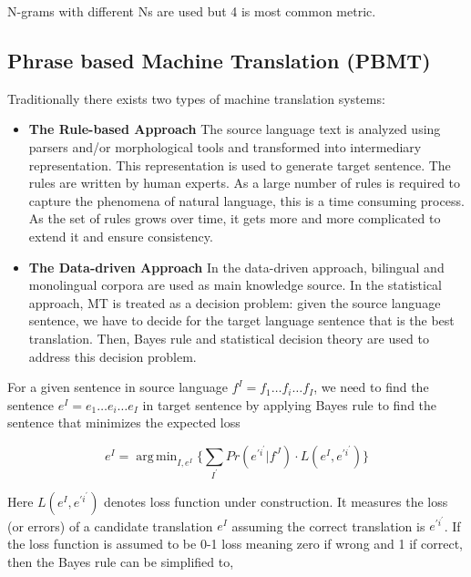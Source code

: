 \documentclass[a4paper]{article}
\DeclareMathOperator*{\argmin}{arg\,min}
\begin{document}
N-grams with different Ns are used but 4 is most common metric.


\subsection{Phrase based Machine Translation (PBMT)}
Traditionally there exists two types of machine translation systems:

\begin{itemize}

  \item \textbf{The Rule-based Approach}
        The  source language text is analyzed using parsers and/or morphological
        tools   and   transformed  into    intermediary   representation.   This
        representation  is  used  to  generate  target  sentence.  The rules are
        written  by human  experts. As  a large number of  rules is  required to
        capture  the  phenomena  of natural language,  this is a  time consuming
        process.  As the set of rules grows over time, it gets more and more
        complicated to extend it and ensure consistency.

  \item \textbf{The Data-driven Approach}
        In the data-driven  approach, bilingual and monolingual corpora are used
        as main knowledge source.  In the statistical approach, MT is treated as
        a  decision problem:  given the  source  language  sentence,  we have to
        decide  for the  target language  sentence that is the best translation.
        Then,  Bayes rule  and  statistical  decision theory are used to address
        this decision problem.
\end{itemize}


For a given sentence in source language $f^{I} = f_1\ldots f_i\ldots f_{I} $, we
need to find the sentence $e^{I} = e_1\ldots e_i\ldots e_{I}$ in target sentence
by applying Bayes rule to find the sentence that minimizes the expected loss


\begin{equation*}
e^{I} =  \argmin_{I,e^{I}} \Bigg\{
  \sum_{I^{'} } Pr(e^{\prime i^\prime} | f^J) \cdot L(e^I, e^{\prime i^\prime})
\Bigg\}
\end{equation*}


Here  $L(e^I, e^{\prime i^\prime})$ denotes loss function under construction. It
measures  the loss  (or errors) of a  candidate translation $e^{I}$ assuming the
correct translation is $e^{\prime i^\prime}$. If the loss function is assumed to
be 0-1  loss meaning  zero if wrong and 1 if correct, then the Bayes rule can be
simplified to,
\end{document}
